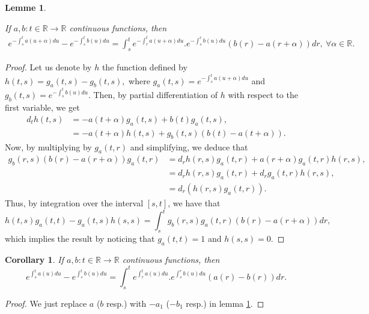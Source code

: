 \documentclass[[a4paper,10pt]{article}
\newcommand{\R}{\mathbb{R}}
\newtheorem{cor}[theorem]{Corollary}%
\newtheorem{lemma}[theorem]{Lemme}%
\begin{document}
 \begin{lemma}\label{AA}\item
If $a,b:t\in \R\rightarrow \R$ continuous functions, then 
\begin{align}e^{-\int^t_s a(u+\alpha)du}-e^{-\int^t_s b(u)du}=\int^t_s e^{-\int^t_r a(u+\alpha)du}.e^{-\int^r_s b(u)du}(b(r)-a(r+\alpha))dr, \ \forall \alpha\in \R.
\end{align}
\end{lemma}
\begin{proof}
Let us denote by $h$ the function defined by $h(t,s)=g_a(t,s)-g_b(t,s),$ where $g_a(t,s)=e^{-\int^t_s a(u+\alpha)du}$ and $g_b(t,s)=e^{-\int^t_s b(u)du}$. Then, by partial differentiation of $h$ with respect to the first variable, we get
$$\begin{aligned}
d_th(t,s)&=-a(t+\alpha) g_a(t,s)+b(t)g_a(t,s),\\
&=-a(t+\alpha)h(t,s)+g_b(t,s)(b(t)-a(t+\alpha)).
\end{aligned}$$
Now, by multiplying by $g_a(t,r)$ and simplifying, we deduce that
$$\begin{aligned}g_b(r,s)(b(r)-a(r+\alpha))g_a(t,r)&=d_r h(r,s)g_a(t,r)+a(r+\alpha)g_a(t,r)h(r,s),\\
&=d_r h(r,s)g_a(t,r)+d_r g_a(t,r)h(r,s),\\
&=d_r(h(r,s)g_a(t,r)).
\end{aligned}$$
Thus, by integration over the interval $[s, t]$, we have that
$$h(t,s)g_a(t,t)-g_a(t,s)h(s,s)=\int^t_s g_b(r,s)g_a(t,r)(b(r)-a(r+\alpha))dr,$$
which implies the result by noticing that $g_a(t, t) = 1$ and $h(s, s) = 0$.
\end{proof}

\begin{cor}\label{corolAA}
If $a,b:t\in \R\rightarrow \R$ continuous functions, then 
\begin{equation}e^{\int^t_s a(u)du}-e^{\int^t_s b(u)du}=\int^t_s e^{ \int^t_r a(u)du}.e^{\int^r_s b(u)du}(a(r)-b(r))dr.
\end{equation}
\end{cor}

\begin{proof}\item
We just replace $a$ ($b$ resp.) with $-a_1$  ($-b_1$ resp.) in lemma \ref{AA}.
\end{proof}
\end{document}
